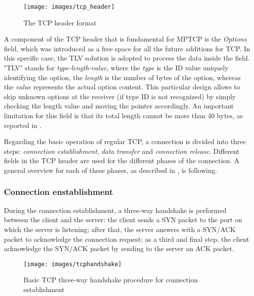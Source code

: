 \begin{figure}[!htb]
\centering
\texttt{[image: images/tcp\_header]}
\caption{The TCP header format}
\label{fig:tcp_header}
\end{figure}

A component of the TCP header that is fundamental for MPTCP is the \textit{Options} field, which was introduced as a free space for all the future additions for TCP. In this specific case, the TLV solution is adopted to process the data inside the field. "TLV" stands for \textit{type-length-value}, where the \textit{type} is the ID value uniquely identifying the option, the \textit{length} is the number of bytes of the option, whereas the \textit{value} represents the actual option content. This particular design allows to skip unknown options at the receiver (if type ID is not recognized) by simply checking the length value and moving the pointer accordingly. An important limitation for this field is that its total length cannot be more than 40 bytes, as reported in .

Regarding the basic operation of regular TCP, a connection is divided into three steps: \textit{connection establishment}, \textit{data transfer} and \textit{connection release}. Different fields in the TCP header are used for the different phases of the connection. A general overview for each of these phases, as described in , is following.

\subsubsection{Connection enstablishment}
During the connection establishment, a  three-way handshake is performed between the client and the server: the client sends a SYN packet to the port on which the server is listening; after that, the server answers with a SYN/ACK packet to acknowledge the connection request; as a third and final step, the client acknowledge the SYN/ACK packet by sending to the server an ACK packet. 

\begin{figure}[!htb]
\centering
\texttt{[image: images/tcphandshake]}
\caption{Basic TCP three-way handshake procedure for connection establishment}
\label{fig:tcphandshake}
\end{figure}

